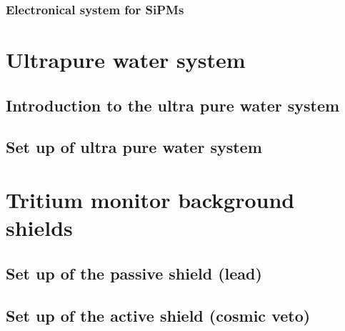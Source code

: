 \documentclass[12pt,a4paper]{book}
\begin{document}
			\subsubsection[Electronical system for a SiPM]{Electronical system for SiPMs}
			\label{subsubsec:SiPMsElectronicalSystem}
			\newpage		
		
	\section{Ultrapure water system}\label{sec:UltraPureWaterSystem}
		
		\subsection[Introduction water system]{Introduction to the ultra pure water system}
		 \label{subsec:IntroductionWaterSystem}
					
		\subsection[Set up water system]{Set up of ultra pure water system} %
		\label{subsec:SetUpWaterSystem}
		\newpage	
	
	\section[Background shields]{Tritium monitor background shields}\label{sec:BackgroundShields}
	
		\subsection[Set up passive shield]{Set up of the passive shield (lead)} %
		\label{subsec:SetUpPassiveShield}
		
		\subsection[Set up Active veto]{Set up of the active shield (cosmic veto)} %
		\label{subsec:SetUpActiveShield}
		\newpage
					
\end{document}
